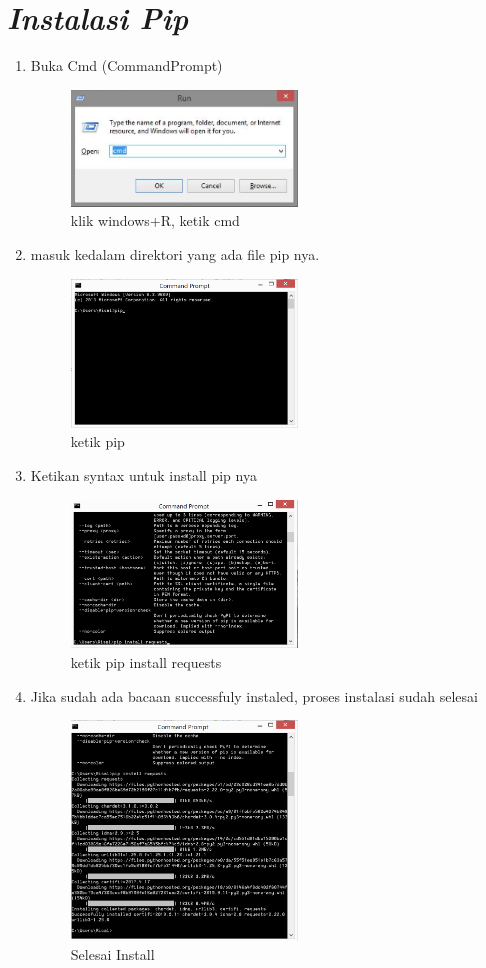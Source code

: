 \section*{\textit{ Instalasi Pip }}
\begin{enumerate}
		\item Buka Cmd (CommandPrompt)
		\begin{figure}[h]
			\includegraphics[width=6cm]{figure/pip 1.png}
			\centering
			\caption{klik windows+R, ketik cmd}
			\end{figure}
		\item masuk kedalam direktori yang ada file pip nya.
			\begin{figure}[h]
			\includegraphics[width=6cm]{figure/pip 2.png}
			\centering
			\caption{ketik pip}
			\end{figure}
		\item Ketikan syntax untuk install pip nya
			\begin{figure}[h]
			\includegraphics[width=6cm]{figure/pip 3.png}
			\centering
			\caption{ketik pip install requests}
			\end{figure}

		\item Jika sudah ada bacaan successfuly instaled, proses instalasi sudah selesai
			\begin{figure}[h]
			\includegraphics[width=6cm]{figure/pip 4.png}
			\centering
			\caption{Selesai Install}
			\end{figure}
\end{enumerate}

